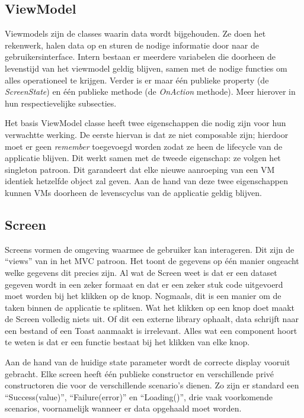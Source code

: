 \documentclass{report}
\begin{document}
\subsection{ViewModel}
Viewmodels zijn de classes waarin data wordt bijgehouden. Ze doen het rekenwerk, halen data op en sturen de nodige informatie door naar de gebruikersinterface.
Intern bestaan er meerdere variabelen die doorheen de levenstijd van het viewmodel geldig blijven, samen met de nodige functies om alles operationeel te krijgen.
Verder is er maar één publieke property (de \textit{ScreenState}) en één publieke methode (de \textit{OnAction} methode). Meer hierover in hun respectievelijke subsecties.

Het basis ViewModel classe heeft twee eigenschappen die nodig zijn voor hun verwachtte werking.
De eerste hiervan is dat ze niet composable zijn; hierdoor moet er geen \textit{remember} toegevoegd worden zodat ze heen de lifecycle van de applicatie blijven.
Dit werkt samen met de tweede eigenschap: ze volgen het singleton patroon. Dit garandeert dat elke nieuwe aanroeping van een VM identiek hetzelfde object zal geven.
Aan de hand van deze twee eigenschappen kunnen VMs doorheen de levenscyclus van de applicatie geldig blijven.




\subsection{Screen}
Screens vormen de omgeving waarmee de gebruiker kan interageren. Dit zijn de ``views'' van in het MVC patroon.
Het toont de gegevens op één manier ongeacht welke gegevens dit precies zijn. 
Al wat de Screen weet is dat er een dataset gegeven wordt in een zeker formaat en dat er een zeker stuk code uitgevoerd moet worden bij het klikken op de knop.
Nogmaals, dit is een manier om de taken binnen de applicatie te splitsen. Wat het klikken op een knop doet maakt de Screen volledig niets uit. Of dit een externe library ophaalt, data schrijft naar een bestand of een Toast aanmaakt is irrelevant.
Alles wat een component hoort te weten is dat er een functie bestaat bij het klikken van elke knop.

Aan de hand van de huidige state parameter wordt de correcte display vooruit gebracht.
Elke screen heeft één publieke constructor en verschillende privé constructoren die voor de verschillende scenario's dienen.
Zo zijn er standard een ``Success(value)'', ``Failure(error)'' en ``Loading()'', drie vaak voorkomende scenarios, voornamelijk wanneer er data opgehaald moet worden.
\end{document}
